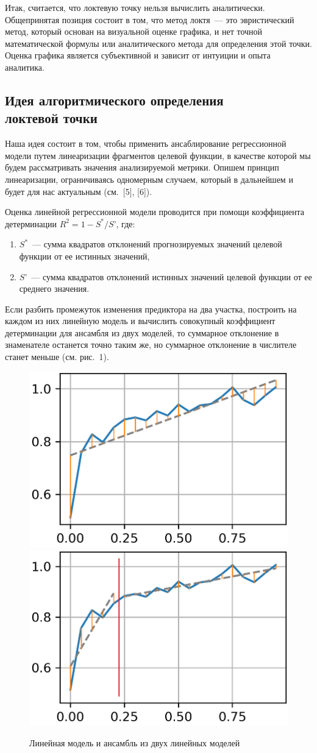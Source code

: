 \documentclass[a4paper,12pt]{article}
\begin{document}
Итак, считается, что локтевую точку нельзя вычислить аналитически. Общепринятая позиция состоит в том, что метод локтя — это эвристический метод, который основан на визуальной оценке графика, и нет точной математической формулы или аналитического метода для определения этой точки. Оценка графика является субъективной и зависит от интуиции и опыта аналитика.

\subsection{Идея алгоритмического определения\\ локтевой точки}

Наша идея состоит в том, чтобы применить ансаблирование регрессионной модели путем линеаризации фрагментов целевой функции, в качестве которой мы будем рассматривать значения анализируемой метрики. Опишем принцип линеаризации, ограничиваясь одномерным случаем, который в дальнейшем и будет для нас актуальным (см. [5], [6]).

Оценка линейной регрессионной модели проводится при помощи коэффициента детерминации $R^2 = 1 - S^*/S’$, где:

\medskip\noindent
\begin{enumerate}
	\item $S^*$ — сумма квадратов отклонений прогнозируемых значений целевой функции от ее истинных значений,
	\item $S’$ — сумма квадратов отклонений истинных значений целевой функции от ее среднего значения.
\end{enumerate}

\medskip\noindent
Если разбить промежуток изменения предиктора на два участка, построить на каждом из них линейную модель и вычислить совокупный коэффициент детерминации для ансамбля из двух моделей, то суммарное отклонение в знаменателе останется точно таким же, но суммарное отклонение в числителе станет меньше (см. рис. 1).

\begin{figure}[!h]
	\centering
	\includegraphics[width=0.4\linewidth]{pictures/Без ансамбля}
	\hspace{0.05\linewidth}
	\includegraphics[width=0.4\linewidth]{pictures/С ансамблем}
	\\
	\caption{Линейная модель и ансамбль из двух линейных моделей}
\end{figure}
\end{document}
